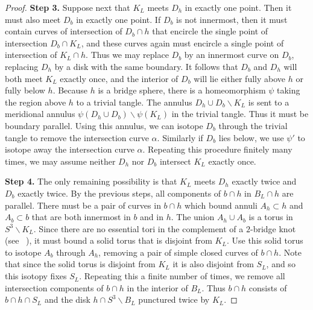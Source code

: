 \documentclass[12pt,reqno]{amsart}
\theoremstyle{plain}
\theoremstyle{definition}
\newcommand{\ssm}{\smallsetminus}
\begin{document}
\begin{proof}
\textbf{Step 3.} Suppose next that $K_L$ meets $D_h$ in exactly one point. Then it 
must also meet $D_b$ in exactly one point. If $D_b$ is not innermost, then it must 
contain curves of intersection of $D_b\cap h$ that encircle the single 
point of intersection $D_b\cap K_L$, and these curves again must encircle 
a single point of intersection of $K_L\cap h$. Thus we may replace $D_b$ by an
innermost curve on $D_b$, replacing $D_h$ by a disk with the same boundary. 
It follows that $D_b$ and $D_h$ will both meet $K_L$ exactly once, and the
interior of $D_b$ will lie either fully above $h$ or fully below $h$. 
Because $h$ is a bridge sphere, there is a homeomorphism $\psi$ taking the 
region above $h$ to a trivial 
tangle. The annulus $D_h \cup D_b \ssm K_L$ is sent to a meridional annulus 
$\psi(D_h\cup D_b) \ssm \psi(K_L)$ in the trivial tangle. Thus it must be boundary 
parallel. Using this annulus, we can isotope $D_b$ through the trivial tangle 
to remove the intersection curve $\alpha$. Similarly if $D_b$ lies below, 
we use $\psi'$ to isotope away the intersection curve $\alpha$. 
Repeating this procedure finitely many times, we may assume neither $D_h$ 
nor $D_b$ intersect $K_L$ exactly once. 

\vskip7pt

\textbf{Step 4.} The only remaining possibility is that $K_L$ meets $D_h$ exactly twice and 
$D_b$ exactly twice. By the previous steps, all components of $b\cap h$ in $B_L\cap h$ are 
parallel. There must be a pair of curves in $b\cap h$ which bound annuli 
$A_h\subset h$ and $A_b\subset b$ that are both innermost in $b$ and in $h$. The union 
$A_h\cup A_b$ is a torus in $S^3 \ssm K_L$. Since there are no essential tori in the 
complement of a $2$-bridge knot (see ~\cite{HatcherThurston1985Incompressible}), it must 
bound a solid torus that is disjoint from $K_L$. Use this solid torus to isotope $A_b$ 
through $A_h$, removing a pair of simple closed curves of $b\cap h$. Note that since the 
solid torus is disjoint from $K_L$ it is also disjoint from $S_L$, and so this isotopy 
fixes $S_L$. Repeating this a finite number of times, we remove all intersection 
components of $b\cap h$ in the interior of $B_L$. Thus $b\cap h$ consists of 
$b\cap h\cap S_L$ and the disk $h\cap S^3\ssm B_L$ punctured twice by $K_L$. 



\end{proof}
\end{document}
